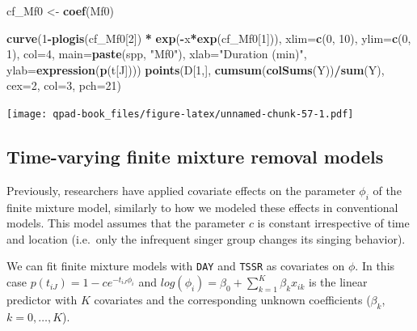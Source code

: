 \documentclass[12pt,]{book}
\newenvironment{Shaded}{\begin{snugshade}}{\end{snugshade}}
\newcommand{\DataTypeTok}[1]{\textcolor[rgb]{0.13,0.29,0.53}{#1}}
\newcommand{\DecValTok}[1]{\textcolor[rgb]{0.00,0.00,0.81}{#1}}
\newcommand{\KeywordTok}[1]{\textcolor[rgb]{0.13,0.29,0.53}{\textbf{#1}}}
\newcommand{\NormalTok}[1]{#1}
\newcommand{\OperatorTok}[1]{\textcolor[rgb]{0.81,0.36,0.00}{\textbf{#1}}}
\newcommand{\StringTok}[1]{\textcolor[rgb]{0.31,0.60,0.02}{#1}}
\begin{document}
\begin{Shaded}
\begin{Highlighting}[]
\NormalTok{cf_Mf0 <-}\StringTok{ }\KeywordTok{coef}\NormalTok{(Mf0)}

\KeywordTok{curve}\NormalTok{(}\DecValTok{1}\OperatorTok{-}\KeywordTok{plogis}\NormalTok{(cf_Mf0[}\DecValTok{2}\NormalTok{]) }\OperatorTok{*}\StringTok{ }\KeywordTok{exp}\NormalTok{(}\OperatorTok{-}\NormalTok{x}\OperatorTok{*}\KeywordTok{exp}\NormalTok{(cf_Mf0[}\DecValTok{1}\NormalTok{])), }
  \DataTypeTok{xlim=}\KeywordTok{c}\NormalTok{(}\DecValTok{0}\NormalTok{, }\DecValTok{10}\NormalTok{), }\DataTypeTok{ylim=}\KeywordTok{c}\NormalTok{(}\DecValTok{0}\NormalTok{, }\DecValTok{1}\NormalTok{), }\DataTypeTok{col=}\DecValTok{4}\NormalTok{, }\DataTypeTok{main=}\KeywordTok{paste}\NormalTok{(spp, }\StringTok{"Mf0"}\NormalTok{),}
  \DataTypeTok{xlab=}\StringTok{"Duration (min)"}\NormalTok{, }\DataTypeTok{ylab=}\KeywordTok{expression}\NormalTok{(}\KeywordTok{p}\NormalTok{(t[J])))}
\KeywordTok{points}\NormalTok{(D[}\DecValTok{1}\NormalTok{,], }\KeywordTok{cumsum}\NormalTok{(}\KeywordTok{colSums}\NormalTok{(Y))}\OperatorTok{/}\KeywordTok{sum}\NormalTok{(Y), }\DataTypeTok{cex=}\DecValTok{2}\NormalTok{, }\DataTypeTok{col=}\DecValTok{3}\NormalTok{, }\DataTypeTok{pch=}\DecValTok{21}\NormalTok{)}
\end{Highlighting}
\end{Shaded}

\texttt{[image: qpad-book\_files/figure-latex/unnamed-chunk-57-1.pdf]}

\hypertarget{time-varying-finite-mixture-removal-models}{%
\subsection{Time-varying finite mixture removal models}\label{time-varying-finite-mixture-removal-models}}

Previously, researchers have applied covariate effects on the parameter
\(\phi_{i}\) of the finite mixture model, similarly to how we modeled these effects in conventional models.
This model assumes that the parameter \(c\) is constant irrespective of time and location
(i.e.~only the infrequent singer group changes its singing behavior).

We can fit finite mixture models with \texttt{DAY} and \texttt{TSSR} as covariates on \(\phi\).
In this case \(p(t_{iJ}) = 1 - c e^{-t_{iJ} \phi_{i}}\) and
\(log(\phi_{i}) = \beta_{0} + \sum^{K}_{k=1} \beta_{k} x_{ik}\)
is the linear predictor with \(K\) covariates and the corresponding unknown coefficients
(\(\beta_{k}\), \(k = 0,\ldots, K\)).
\end{document}
